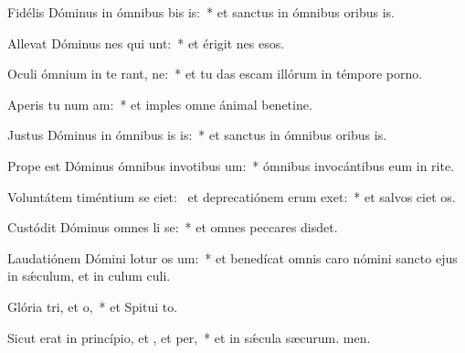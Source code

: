 \item Fidélis Dóminus in ómnibus bis is:~* et sanctus in ómnibus oribus is.
\item Allevat Dóminus nes qui unt:~* et érigit nes esos.
\item Oculi ómnium in te rant, ne:~* et tu das escam illórum in témpore porno.
\item Aperis tu num am:~* et imples omne ánimal benetine.
\item Justus Dóminus in ómnibus is is:~* et sanctus in ómnibus oribus is.
\item Prope est Dóminus ómnibus invotibus um:~* ómnibus invocántibus eum in rite.
\item Voluntátem timéntium se ciet:~\pscross{} et deprecatiónem erum exet:~* et salvos ciet os.
\item Custódit Dóminus omnes li se:~* et omnes peccares disdet.
\item Laudatiónem Dómini lotur os um:~* et benedícat omnis caro nómini sancto ejus in sǽculum, et in culum culi.
\item Glória tri, et o,~* et Spitui to.
\item Sicut erat in princípio, et , et per,~* et in sǽcula sæcurum. men.

